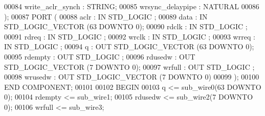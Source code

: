 \begin{DoxyCode}
{00084         write\_aclr\_synch        : \textcolor{comment}{STRING};
00085         wrsync\_delaypipe        : \textcolor{comment}{NATURAL}
00086     );
00087     \textcolor{keywordflow}{PORT} (
00088             aclr    : \textcolor{keywordflow}{IN} \textcolor{comment}{STD\_LOGIC} ;
00089             data    : \textcolor{keywordflow}{IN} \textcolor{comment}{STD\_LOGIC\_VECTOR} (\textcolor{vhdllogic}{}\textcolor{vhdllogic}{63} \textcolor{keywordflow}{DOWNTO} \textcolor{vhdllogic}{}\textcolor{vhdllogic}{0});
00090             rdclk   : \textcolor{keywordflow}{IN} \textcolor{comment}{STD\_LOGIC} ;
00091             rdreq   : \textcolor{keywordflow}{IN} \textcolor{comment}{STD\_LOGIC} ;
00092             wrclk   : \textcolor{keywordflow}{IN} \textcolor{comment}{STD\_LOGIC} ;
00093             wrreq   : \textcolor{keywordflow}{IN} \textcolor{comment}{STD\_LOGIC} ;
00094             q   : \textcolor{keywordflow}{OUT} \textcolor{comment}{STD\_LOGIC\_VECTOR} (\textcolor{vhdllogic}{}\textcolor{vhdllogic}{63} \textcolor{keywordflow}{DOWNTO} \textcolor{vhdllogic}{}\textcolor{vhdllogic}{0});
00095             rdempty : \textcolor{keywordflow}{OUT} \textcolor{comment}{STD\_LOGIC} ;
00096             rdusedw : \textcolor{keywordflow}{OUT} \textcolor{comment}{STD\_LOGIC\_VECTOR} (\textcolor{vhdllogic}{}\textcolor{vhdllogic}{7} \textcolor{keywordflow}{DOWNTO} \textcolor{vhdllogic}{}\textcolor{vhdllogic}{0});
00097             wrfull  : \textcolor{keywordflow}{OUT} \textcolor{comment}{STD\_LOGIC} ;
00098             wrusedw : \textcolor{keywordflow}{OUT} \textcolor{comment}{STD\_LOGIC\_VECTOR} (\textcolor{vhdllogic}{}\textcolor{vhdllogic}{7} \textcolor{keywordflow}{DOWNTO} \textcolor{vhdllogic}{}\textcolor{vhdllogic}{0})
00099     );
00100     \textcolor{keywordflow}{END} \textcolor{keywordflow}{COMPONENT};
00101 
00102 \textcolor{vhdlkeyword}{BEGIN}
00103     \textcolor{vhdlchar}{q}    \textcolor{vhdlchar}{<=} \textcolor{vhdlchar}{sub_wire0}\textcolor{vhdlchar}{(}\textcolor{vhdllogic}{}\textcolor{vhdllogic}{63} \textcolor{keywordflow}{DOWNTO} \textcolor{vhdllogic}{}\textcolor{vhdllogic}{0}\textcolor{vhdlchar}{)};
00104     \textcolor{vhdlchar}{rdempty}    \textcolor{vhdlchar}{<=} \textcolor{vhdlchar}{sub_wire1};
00105     \textcolor{vhdlchar}{rdusedw}    \textcolor{vhdlchar}{<=} \textcolor{vhdlchar}{sub_wire2}\textcolor{vhdlchar}{(}\textcolor{vhdllogic}{}\textcolor{vhdllogic}{7} \textcolor{keywordflow}{DOWNTO} \textcolor{vhdllogic}{}\textcolor{vhdllogic}{0}\textcolor{vhdlchar}{)};
00106     \textcolor{vhdlchar}{wrfull}    \textcolor{vhdlchar}{<=} \textcolor{vhdlchar}{sub_wire3};
}
\end{DoxyCode}
